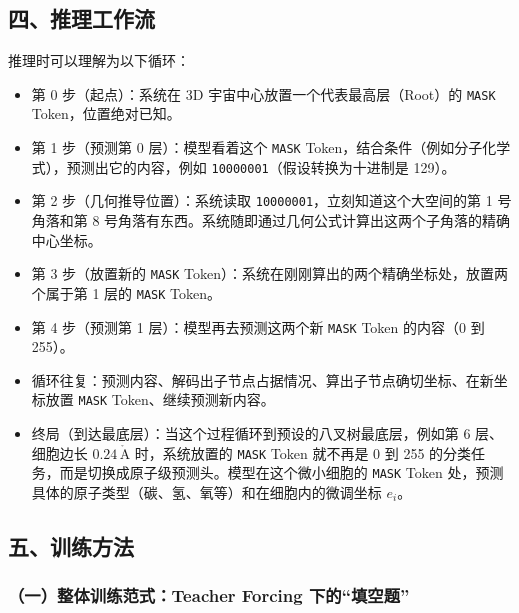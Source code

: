 \hypertarget{ux56dbux63a8ux7406ux5de5ux4f5cux6d41}{%
\subsection{四、推理工作流}\label{ux56dbux63a8ux7406ux5de5ux4f5cux6d41}}

推理时可以理解为以下循环：

\begin{itemize}
\tightlist
\item
  第 0 步（起点）：系统在 3D 宇宙中心放置一个代表最高层（Root）的 \texttt{MASK} Token，位置绝对已知。
\item
  第 1 步（预测第 0 层）：模型看着这个 \texttt{MASK} Token，结合条件（例如分子化学式），预测出它的内容，例如 \texttt{10000001}（假设转换为十进制是 129）。
\item
  第 2 步（几何推导位置）：系统读取 \texttt{10000001}，立刻知道这个大空间的第 1 号角落和第 8 号角落有东西。系统随即通过几何公式计算出这两个子角落的精确中心坐标。
\item
  第 3 步（放置新的 \texttt{MASK} Token）：系统在刚刚算出的两个精确坐标处，放置两个属于第 1 层的 \texttt{MASK} Token。
\item
  第 4 步（预测第 1 层）：模型再去预测这两个新 \texttt{MASK} Token 的内容（0 到 255）。
\item
  循环往复：预测内容、解码出子节点占据情况、算出子节点确切坐标、在新坐标放置 \texttt{MASK} Token、继续预测新内容。
\item
  终局（到达最底层）：当这个过程循环到预设的八叉树最底层，例如第 6 层、细胞边长 \(0.24\,\mathrm{\mathring{A}}\) 时，系统放置的 \texttt{MASK} Token 就不再是 0 到 255 的分类任务，而是切换成原子级预测头。模型在这个微小细胞的 \texttt{MASK} Token 处，预测具体的原子类型（碳、氢、氧等）和在细胞内的微调坐标 \(e_i\)。
\end{itemize}

\hypertarget{ux4e94ux8badux7ec3ux65b9ux6cd5}{%
\subsection{五、训练方法}\label{ux4e94ux8badux7ec3ux65b9ux6cd5}}

\hypertarget{ux4e00ux6574ux4f53ux8badux7ec3ux8303ux5f0fteacher-forcing-ux4e0bux7684ux586bux7a7aux9898}{%
\subsubsection{（一）整体训练范式：Teacher Forcing 下的``填空题''}\label{ux4e00ux6574ux4f53ux8badux7ec3ux8303ux5f0fteacher-forcing-ux4e0bux7684ux586bux7a7aux9898}}

